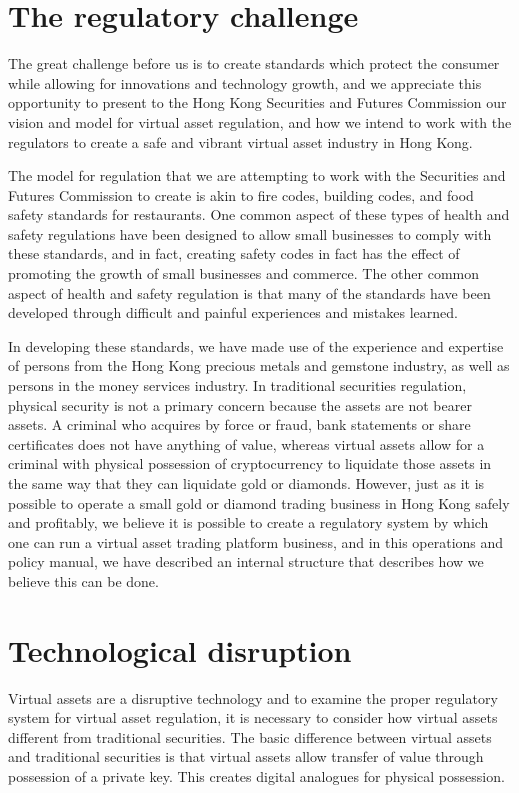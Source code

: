 \section{The regulatory challenge}
The great challenge before us is to create standards which protect the
consumer while allowing for innovations and technology growth, and we
appreciate this opportunity to present to the Hong Kong Securities and
Futures Commission our vision and model for virtual asset regulation,
and how we intend to work with the regulators to create a safe and
vibrant virtual asset industry in Hong Kong.

The model for regulation that we are attempting to work with the
Securities and Futures Commission to create is akin to fire codes,
building codes, and food safety standards for restaurants.  One common
aspect of these types of health and safety regulations have been
designed to allow small businesses to comply with these standards, and
in fact, creating safety codes in fact has the effect of promoting the
growth of small businesses and commerce.  The other common aspect of
health and safety regulation is that many of the standards have been
developed through difficult and painful experiences and mistakes
learned.

In developing these standards, we have made use of the experience and
expertise of persons from the Hong Kong precious metals and gemstone
industry, as well as persons in the money services industry.  In
traditional securities regulation, physical security is not a primary
concern because the assets are not bearer assets.  A criminal who
acquires by force or fraud, bank statements or share certificates does
not have anything of value, whereas virtual assets allow for a criminal
with physical possession of cryptocurrency to liquidate those assets
in the same way that they can liquidate gold or diamonds.  However,
just as it is possible to operate a small gold or diamond trading
business in Hong Kong safely and profitably, we believe it is possible
to create a regulatory system by which one can run a virtual asset
trading platform business, and in this operations and policy manual,
we have described an internal structure that describes how we believe
this can be done.

\section{Technological disruption}
Virtual assets are a disruptive technology and to examine the proper
regulatory system for virtual asset regulation, it is necessary to
consider how virtual assets different from traditional securities.
The basic difference between virtual assets and traditional securities
is that virtual assets allow transfer of value through possession of a
private key.  This creates digital analogues for physical possession.

